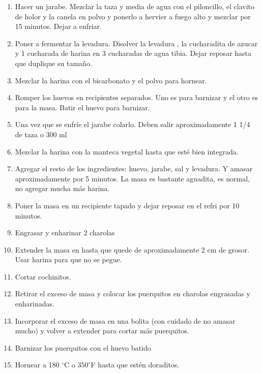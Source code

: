 \begin{enumerate}
\item Hacer un jarabe. Mezclar la taza y media de agua con el piloncillo, el clavito de holor y la canela en polvo y ponerlo a hervier a fuego alto y mezclar por 15 minutos. Dejar a enfriar. 
\item Poner a fermentar la levadura. Disolver la levadura , la cucharadita de azucar y 1 cucharada de harina en 3 cucharadas de agua tibia. Dejar reposar hasta que duplique su tamaño. 
\item Mezclar la harina con el bicarbonato y el polvo para hornear. 
\item Romper los huevos en recipientes separados. Uno es para barnizar y el otro es para la masa. Batir el huevo para barnizar. 
\item Una vez que se enfríe el jarabe colarlo. Deben salir aproximadamente 1 1/4 de taza o 300 ml
\item Mezclar la harina con la manteca vegetal hasta que esté bien integrada. 
\item Agregar el resto de los ingredientes: huevo, jarabe, sal y levadura. Y amasar aproximadamente por 5 minutos. La masa es bastante aguadita, es normal, no agregar mucha más harina. 
\item Poner la masa en un recipiente tapado y dejar reposar en el refri por 10 minutos. 
\item Engrasar y enharinar 2 charolas 
\item Extender la masa en hasta que quede de aproximadamente 2 cm de grosor. Usar harina para que no se pegue. 
\item Cortar cochinitos. 
\item Retirar el exceso de masa y colocar los puerquitos en charolas engrasadas y enharinadas. 
\item Incorporar el exceso de masa en una bolita (con cuidado de no amasar mucho) y volver a extender para cortar más puerquitos. 
\item Barnizar los puerquitos con el huevo batido
\item Hornear a 180 $^\circ$C o $350^\circ$F hasta que estén doraditos. 
\end{enumerate}
